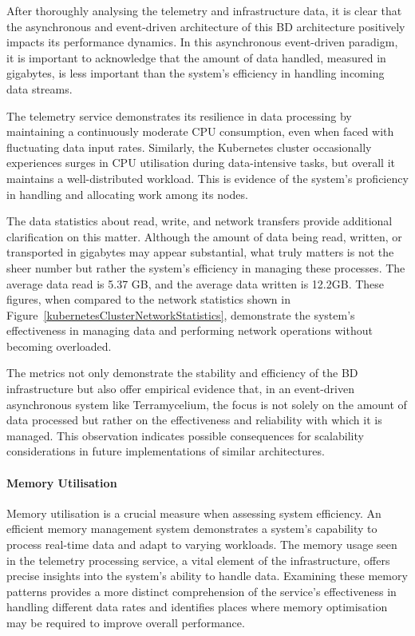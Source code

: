 \documentclass{ieeeaccess}
\begin{document}
After thoroughly analysing the telemetry and infrastructure data, it is clear that the asynchronous and event-driven architecture of this BD architecture positively impacts its performance dynamics. In this asynchronous event-driven paradigm, it is important to acknowledge that the amount of data handled, measured in gigabytes, is less important than the system's efficiency in handling incoming data streams.

The telemetry service demonstrates its resilience in data processing by maintaining a continuously moderate CPU consumption, even when faced with fluctuating data input rates. Similarly, the Kubernetes cluster occasionally experiences surges in CPU utilisation during data-intensive tasks, but overall it maintains a well-distributed workload. This is evidence of the system's proficiency in handling and allocating work among its nodes.

The data statistics about read, write, and network transfers provide additional clarification on this matter. Although the amount of data being read, written, or transported in gigabytes may appear substantial, what truly matters is not the sheer number but rather the system's efficiency in managing these processes. The average data read is 5.37 GB, and the average data written is 12.2GB. These figures, when compared to the network statistics shown in Figure~\ref{kubernetesClusterNetworkStatistics}, demonstrate the system's effectiveness in managing data and performing network operations without becoming overloaded.

The metrics not only demonstrate the stability and efficiency of the BD infrastructure but also offer empirical evidence that, in an event-driven asynchronous system like Terramycelium, the focus is not solely on the amount of data processed but rather on the effectiveness and reliability with which it is managed. This observation indicates possible consequences for scalability considerations in future implementations of similar architectures.

\paragraph{Memory Utilisation}

Memory utilisation is a crucial measure when assessing system efficiency. An efficient memory management system demonstrates a system's capability to process real-time data and adapt to varying workloads. The memory usage seen in the telemetry processing service, a vital element of the infrastructure, offers precise insights into the system's ability to handle data. Examining these memory patterns provides a more distinct comprehension of the service's effectiveness in handling different data rates and identifies places where memory optimisation may be required to improve overall performance.
\end{document}
